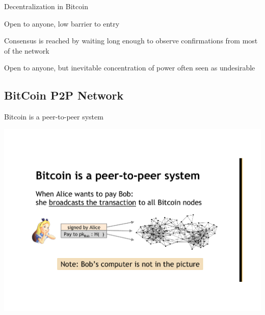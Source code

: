\begin{frame}{Decentralization in Bitcoin}


\BI
\item	Open to anyone, low barrier to entry
\EI

\BI
\item	Consensus is reached by waiting long enough to observe confirmations 
from most of the network
\EI

\BI
\item Open to anyone, but inevitable concentration of power
	often seen as undesirable
\EI

\end{frame}

\subsection{BitCoin P2P Network}


\begin{frame}{Bitcoin is a peer-to-peer system}
	

\begin{center}
\includegraphics[width=\textwidth]{p2p}
\end{center}

\end{frame}





